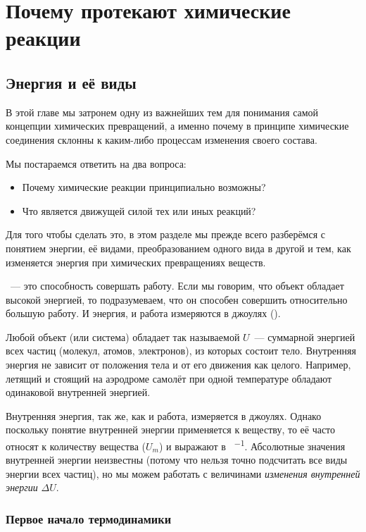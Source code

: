 \chapter{Почему протекают химические реакции}

\section{Энергия и её виды}

В этой главе мы затронем одну из важнейших тем для понимания самой концепции химических превращений, а именно почему в принципе химические соединения склонны к каким-либо процессам изменения своего состава.

Мы постараемся ответить на два вопроса:

\begin{itemize}
    \item Почему химические реакции принципиально возможны?
    \item Что является движущей силой тех или иных реакций?
\end{itemize}

Для того чтобы сделать это, в этом разделе мы прежде всего разберёмся с понятием энергии, её видами, преобразованием одного вида в другой и тем, как изменяется энергия при химических превращениях веществ.

~--- это способность совершать работу. Если мы говорим, что объект обладает высокой энергией, то подразумеваем, что он способен совершить относительно большую работу. И энергия, и работа измеряются в джоулях (\unit{\ruJ}).

Любой объект (или система) обладает так называемой  $U$~--- суммарной энергией всех частиц (молекул, атомов, электронов), из которых состоит тело. Внутренняя энергия не зависит от положения тела и от его движения как целого. Например, летящий и стоящий на аэродроме самолёт при одной температуре обладают одинаковой внутренней энергией.

Внутренняя энергия, так же, как и работа, измеряется в джоулях. Однако поскольку понятие внутренней энергии применяется к веществу, то её часто относят к количеству вещества ($U_m$) и выражают в \unit{\ruJ\per\ruMole}. Абсолютные значения внутренней энергии неизвестны (потому что нельзя точно подсчитать все виды энергии всех частиц), но мы можем работать с величинами \emph{изменения внутренней энергии} $\Delta U$.

\subsection*{Первое начало термодинамики}

